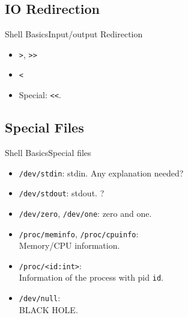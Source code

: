 \documentclass[aspectratio=169]{beamer}
\begin{document}
\subsection{IO Redirection}
\begin{frame}{Shell Basics}{Input/output Redirection}

\begin{itemize}
\item
  \texttt{\textgreater{}}, \texttt{\textgreater{}\textgreater{}}
\item
  \texttt{\textless{}}
\item
  Special: \texttt{\textless{}\textless{}}.
\end{itemize}

\end{frame}

\subsection{Special Files}
\begin{frame}{Shell Basics}{Special files}

\begin{itemize}[<+->]
\item
  \texttt{/dev/stdin}: stdin. Any explanation needed?
\item
  \texttt{/dev/stdout}: stdout. ?
\item
  \texttt{/dev/zero}, \texttt{/dev/one}: zero and one.
\item
  \texttt{/proc/meminfo}, \texttt{/proc/cpuinfo}:\\
  Memory/CPU information.
\item
  \texttt{/proc/\textless{}id:int\textgreater{}}:\\
  Information of the process with pid \texttt{id}.
\item
  \texttt{/dev/null}:\\
  BLACK HOLE.
\end{itemize}

\end{frame}

\end{document}
